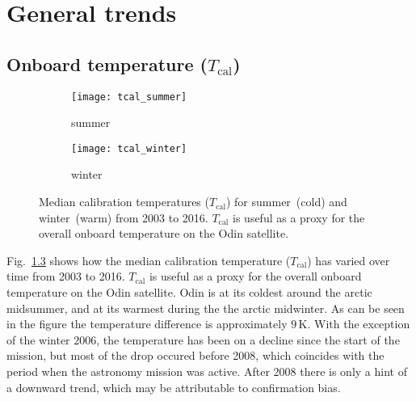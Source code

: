 \chapter{General trends}
\label{sec:general}

\section{Onboard temperature ($T_\mathrm{cal}$)}
\label{sec:Tcal}

\begin{figure}[ht]
    \centering
    \begin{subfigure}[b]{0.9545\textwidth}
        \texttt{[image: tcal\_summer]}
        \caption{summer}\label{fig:tcal:summer}
    \end{subfigure}
    \begin{subfigure}[b]{0.9545\textwidth}
        \texttt{[image: tcal\_winter]}
        \caption{winter}\label{fig:tcal:winter}
    \end{subfigure}
    \caption{Median calibration temperatures ($T_\mathrm{cal}$) for
        summer~(cold) and winter~(warm) from 2003 to 2016. $T_\mathrm{cal}$ is
        useful as a proxy for the overall onboard temperature on the Odin
        satellite.}\label{fig:tcal}
\end{figure}

\noindent
Fig.~\ref{fig:tcal} shows how the median calibration temperature
($T_\mathrm{cal}$) has varied over time from 2003 to 2016.  $T_\mathrm{cal}$ is
useful as a proxy for the overall onboard temperature on the Odin satellite.
Odin is at its coldest around the arctic midsummer, and at its warmest during
the the arctic midwinter.  As can be seen in the figure the temperature
difference is approximately $9\,\mathrm{K}$.  With the exception of the
winter 2006, the temperature has been on a decline since the start of the
mission, but most of the drop occured before 2008, which coincides with the
period when the astronomy mission was active.  After 2008 there is only a hint
of a downward trend, which may be attributable to confirmation bias.
